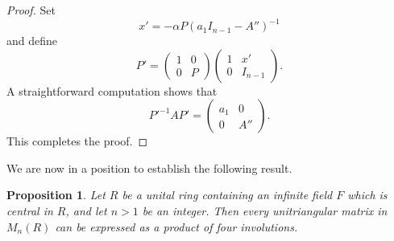 \documentclass{amsart}
\newtheorem{proposition}[theorem]{Proposition}
\theoremstyle{definition}
\begin{document}
\begin{proof}
	Set
	\[
	x'=-\alpha P (a_1 I_{n-1}-A'')^{-1}
	\]
	and define
	\[
	P'=
	\begin{pmatrix}
		1 & 0\\
		0 & P
	\end{pmatrix}
	\begin{pmatrix}
		1 & x'\\
		0 & I_{n-1}
	\end{pmatrix}.
	\]
	A straightforward computation shows that
	\[
	P'^{-1}AP'=
	\begin{pmatrix}
		a_1 & 0\\
		0 & A''
	\end{pmatrix}.
	\]
	This completes the proof.
\end{proof}

We are now in a position to establish the following result.

\begin{proposition}
	Let $R$ be a unital ring containing an infinite field $F$ which is central in $R$, and let $n>1$ be an integer.
	Then every unitriangular matrix in $M_n(R)$ can be expressed as a product of four involutions.
\end{proposition}
\end{document}
